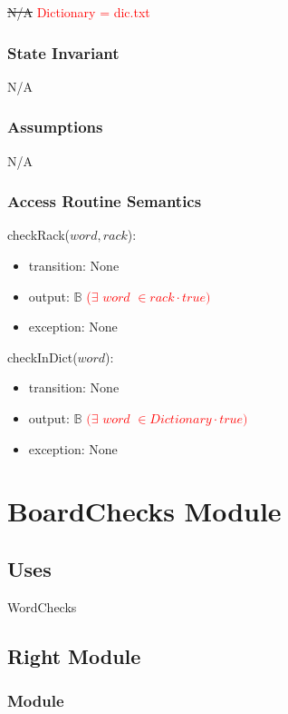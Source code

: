 \documentclass[12pt]{article}
\begin{document}
\sout{N/A} \textcolor{red}{Dictionary = dic.txt}

\subsubsection* {State Invariant}

N/A

\subsubsection* {Assumptions}

N/A

\subsubsection* {Access Routine Semantics}

\noindent checkRack($word, rack$):
\begin{itemize}
\item transition: None
\item output: \sout{$\mathbb{B}$} \textcolor{red}{($\exists$   $word$ $\in rack \cdot true)$}
\item exception: None
\end{itemize}

\noindent checkInDict($word$):
\begin{itemize}
\item transition: None
\item output: \sout{$\mathbb{B}$} \textcolor{red}{$(\exists$   $word$ $\in Dictionary \cdot true)$}
\item exception: None
\end{itemize}

\newpage

\section* {BoardChecks Module}

\subsection* {Uses}

WordChecks

\subsection*{Right Module}

\subsubsection*{Module}
\end{document}
